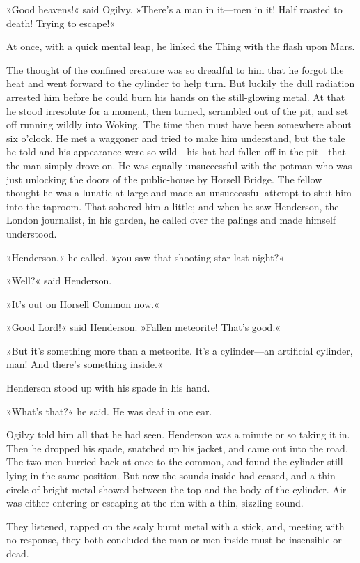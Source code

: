 »Good heavens!« said Ogilvy. »There's a man in it—men in it! Half roasted to death! Trying to escape!«

At once, with a quick mental leap, he linked the Thing with the flash upon Mars.

The thought of the confined creature was so dreadful to him that he forgot the heat and went forward to the cylinder to help turn. But luckily the dull radiation arrested him before he could burn his hands on the still-glowing metal. At that he stood irresolute for a moment, then turned, scrambled out of the pit, and set off running wildly into Woking. The time then must have been somewhere about six o'clock. He met a waggoner and tried to make him understand, but the tale he told and his appearance were so wild—his hat had fallen off in the pit—that the man simply drove on. He was equally unsuccessful with the potman who was just unlocking the doors of the public-house by Horsell Bridge. The fellow thought he was a lunatic at large and made an unsuccessful attempt to shut him into the taproom. That sobered him a little; and when he saw Henderson, the London journalist, in his garden, he called over the palings and made himself understood.

»Henderson,« he called, »you saw that shooting star last night?«

»Well?« said Henderson.

»It's out on Horsell Common now.«

»Good Lord!« said Henderson. »Fallen meteorite! That's good.«

»But it's something more than a meteorite. It's a cylinder—an artificial cylinder, man! And there's something inside.«

Henderson stood up with his spade in his hand.

»What's that?« he said. He was deaf in one ear.

Ogilvy told him all that he had seen. Henderson was a minute or so taking it in. Then he dropped his spade, snatched up his jacket, and came out into the road. The two men hurried back at once to the common, and found the cylinder still lying in the same position. But now the sounds inside had ceased, and a thin circle of bright metal showed between the top and the body of the cylinder. Air was either entering or escaping at the rim with a thin, sizzling sound.

They listened, rapped on the scaly burnt metal with a stick, and, meeting with no response, they both concluded the man or men inside must be insensible or dead.


